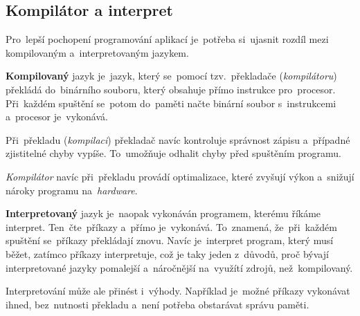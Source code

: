 \documentclass[10pt,a4paper]{article}
\begin{document}
        \subsection{Kompilátor a interpret}
        Pro~lepší pochopení programování aplikací je~potřeba si~ujasnit rozdíl mezi kompilovaným a~interpretovaným jazykem.

        \textbf{Kompilovaný} jazyk je~jazyk, který se~pomocí tzv.~překladače (\emph{kompilátoru}) překládá do~binárního souboru, který obsahuje přímo instrukce pro~procesor. Při~každém spuštění se~potom do~paměti načte binární soubor s~instrukcemi a~procesor je~vykonává.
        
        Při~překladu (\emph{kompilaci}) překladač navíc kontroluje správnost zápisu a~případné zjistitelné chyby vypíše. To~umožňuje odhalit chyby před spuštěním programu.

        \emph{Kompilátor} navíc při~překladu provádí optimalizace, které zvyšují výkon a~snižují nároky programu na~\emph{hardware}.

        \textbf{Interpretovaný} jazyk je~naopak vykonáván programem, kterému říkáme interpret. Ten~čte~příkazy a~přímo je~vykonává. To~znamená, že~při~každém spuštění se~příkazy překládají znovu. Navíc je~interpret program, který musí běžet, zatímco příkazy interpretuje, což je taky jeden z~důvodů, proč bývají interpretované jazyky pomalejší a~náročnější na~využítí zdrojů, než~kompilovaný.
        
        Interpretování může ale přinést i~výhody. Například je~možné příkazy vykonávat ihned, bez~nutnosti překladu a~není potřeba obstarávat správu paměti. \cite{ueda:compiled}
        
\end{document}

